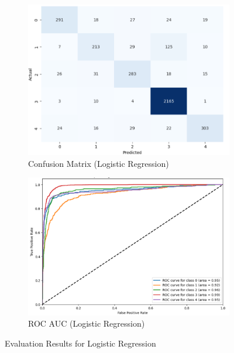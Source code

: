 \vspace{0.25em}

\begin{figure}[h!]
    \centering
    \begin{subfigure}[b]{0.49\textwidth}
        \centering
        \includegraphics[width=\textwidth]{Images/LR Confusion Matrix.png}
        \caption{Confusion Matrix (Logistic Regression)}
        \label{LRCM}  %
    \end{subfigure}
    \hfill
    \begin{subfigure}[b]{0.49\textwidth}
        \centering
        \includegraphics[width=\textwidth]{Images/LR ROC.png}
        \caption{ROC AUC (Logistic Regression)}
        \label{LRROC}  %
    \end{subfigure}
    \caption{Evaluation Results for Logistic Regression}
    \label{fig:comparison}
\end{figure}

